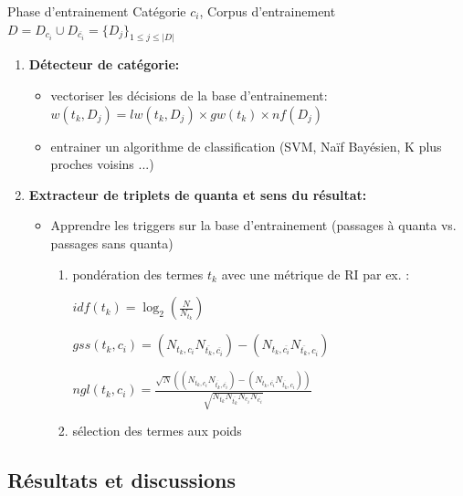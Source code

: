 \documentclass[newPxFont,pagenumber]{beamer}
\begin{document}
\begin{frame}{Phase d'entrainement}
Catégorie  $c_i$, Corpus d'entrainement  $D = D_{c_i} \cup D_{\overline{c_i}} = \lbrace D_j\rbrace_{1\leq j\leq \vert D \vert}$
\begin{enumerate}
\item \textbf{Détecteur de catégorie: }
\begin{itemize}
\item vectoriser les décisions de la base d'entrainement: $w(t_k, D_j) = lw(t_k, D_j) \times gw(t_k) \times nf(D_j)$ \cite{salton1988term-weighting}
\item entrainer un algorithme de classification  (SVM, Naïf Bayésien, K plus proches voisins ...)
\end{itemize}
\item \textbf{Extracteur de triplets de quanta et sens du résultat:}
\begin{itemize}
\item Apprendre les triggers sur la base d'entrainement (passages à quanta vs. passages sans quanta)
\begin{enumerate}
\item pondération des termes $t_k$ avec une métrique de RI par ex. :


 $idf(t_k) = \log_2 (\frac{N}{N_{t_k}})$  \cite{sparck1972idf}


 $gss(t_k,c_i) = (N_{t_k,c_i} N_{\overline{t_k},\overline{c_i}}) -  (N_{t_k,\overline{c_i}} N_{\overline{t_k},c_i})$ \cite{galavotti2000gss}

 $ngl(t_k,c_i) = \frac{\sqrt{N} ((N_{t_k,c_i} N_{\overline{t_k},\overline{c_i}}) - (N_{t_k,\overline{c_i}} N_{\overline{t_k},c_i}))}{\sqrt{N_{t_k} N_{\overline{t_k}} N_{c_i} N_{\overline{c_i}}}}$ \cite{ng1997ngl}
\item sélection des termes aux poids 
\end{enumerate}
\end{itemize}
\end{enumerate}
\end{frame}

\subsection{Résultats et discussions}
\end{document}
